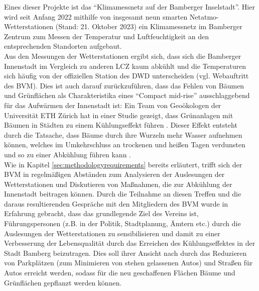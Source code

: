 Eines dieser Projekte ist das \enquote{Klimamessnetz auf der Bamberger Inselstadt}. Hier wird seit Anfang 2022 mithilfe von insgesamt neun smarten Netatmo-Wetterstationen (Stand: 21. Oktober 2023) ein Klimamessnetz im Bamberger Zentrum zum Messen der Temperatur und Luftfeuchtigkeit an den entsprechenden Standorten aufgebaut. \\ Aus den Messungen der Wetterstationen ergibt sich, dass sich die Bamberger Innenstadt im Vergleich zu anderen \ac{LCZ} kaum abkühlt und die Temperaturen sich häufig von der offiziellen Station des \ac{DWD} unterscheiden (vgl. Webauftritt des \ac{BVM}). Dies ist auch darauf zurückzuführen, dass das Fehlen von Bäumen und Grünflächen als Charakteristika eines \enquote{Compact mid-rise} ausschlaggebend für das Aufwärmen der Innenstadt ist: Ein Team von Geoökologen der Universität ETH Zürich hat in einer Studie gezeigt, dass Grünanlagen mit Bäumen in Städten zu einem Kühlungseffekt führen \cite{bastin2019global}. Dieser Effekt entsteht durch die Tatsache, dass Bäume durch ihre Wurzeln mehr Wasser aufnehmen können, welches im Umkehrschluss an trockenen und heißen Tagen verdunsten und so zu einer Abkühlung führen kann \cite{bastin2019global}. \\ Wie in Kapitel \ref{sec:methodologyrequirements} bereits erläutert, trifft sich der \ac{BVM} in regelmäßigen Abständen zum Analysieren der Auslesungen der Wetterstationen und Diskutieren von Maßnahmen, die zur Abkühlung der Innenstadt beitragen können. Durch die Teilnahme an diesen Treffen und die daraus resultierenden Gespräche mit den Mitgliedern des \ac{BVM} wurde in Erfahrung gebracht, dass das grundlegende Ziel des Vereins ist, Führungspersonen (z.B. in der Politik, Stadtplanung, Ämtern etc.) durch die Auslesungen der Wetterstationen zu sensibilisieren und damit zu einer Verbesserung der Lebensqualität durch das Erreichen des Kühlungseffektes in der Stadt Bamberg beizutragen. Dies soll ihrer Ansicht nach durch das Reduzieren von Parkplätzen (zum Minimieren von stehen gelassenen Autos) und Straßen für Autos erreicht werden, sodass für die neu geschaffenen Flächen Bäume und Grünflächen gepflanzt werden können.

